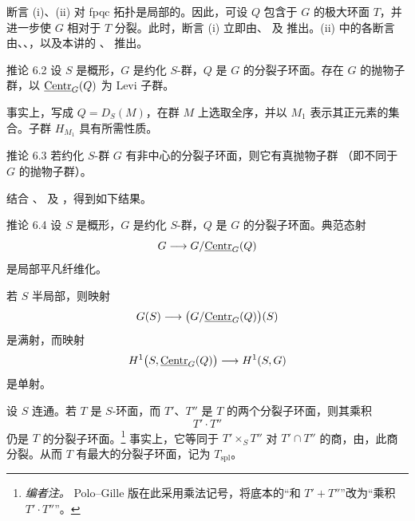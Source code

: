 断言 \textup{(i)}、\textup{(ii)} 对 fpqc 拓扑是局部的。因此，可设 \(Q\) 包含于 \(G\) 的极大环面 \(T\)，并进一步使 \(G\) 相对于 \(T\) 分裂。此时，断言 \textup{(i)} 立即由、 及  推出。\textup{(ii)} 中的各断言由、、，以及本讲的 、 推出。

\begin{sgastatement}{推论 6.2}
设 \(S\) 是概形，\(G\) 是约化 \(S\)-群，\(Q\) 是 \(G\) 的分裂子环面。存在 \(G\) 的抛物子群，以 \(\underline{\operatorname{Centr}}_G(Q)\) 为 Levi 子群。
\end{sgastatement}

事实上，写成 \(Q=D_S(M)\)，在群 \(M\) 上选取全序，并以 \(M_1\) 表示其正元素的集合。子群 \(H_{M_1}\) 具有所需性质。

\begin{sgastatement}{推论 6.3}
若约化 \(S\)-群 \(G\) 有非中心的分裂子环面，则它有真抛物子群 \textup{（即不同于 \(G\) 的抛物子群）}。
\end{sgastatement}

结合 、 及 ，得到如下结果。

\begin{sgastatement}{推论 6.4}
设 \(S\) 是概形，\(G\) 是约化 \(S\)-群，\(Q\) 是 \(G\) 的分裂子环面。典范态射
\[
 G\longrightarrow G/\underline{\operatorname{Centr}}_G(Q)
\]
是局部平凡纤维化。

若 \(S\) 半局部，则映射
\[
 G(S)\longrightarrow\bigl(G/\underline{\operatorname{Centr}}_G(Q)\bigr)(S)
\]
是满射，而映射
\[
 H^1\bigl(S,\underline{\operatorname{Centr}}_G(Q)\bigr)\longrightarrow H^1(S,G)
\]
是单射。
\end{sgastatement}


设 \(S\) 连通。若 \(T\) 是 \(S\)-环面，而 \(T'\)、\(T''\) 是 \(T\) 的两个分裂子环面，则其乘积
\[
 T'\cdot T''
\]
仍是 \(T\) 的分裂子环面。\footnote{\emph{编者注。} Polo--Gille 版在此采用乘法记号，将底本的“和 \(T'+T''\)”改为“乘积 \(T'\cdot T''\)”。}
事实上，它等同于 \(T'\times_S T''\) 对 \(T'\cap T''\) 的商，由，此商分裂。从而 \(T\) 有最大的分裂子环面，记为 \(T_{\mathrm{spl}}\)。

